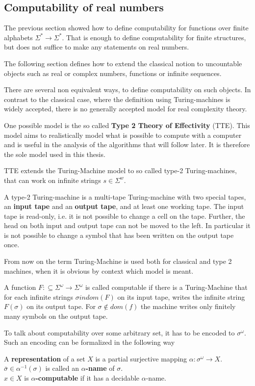 \subsection{Computability of real numbers}
The previous section showed how to define computability for functions over finite alphabets $\Sigma^* \to \Sigma^*$. 
That is enough to define computability for finite structures, but does not
suffice to make any statements on real numbers.

The following section defines how to extend the classical notion to uncountable
objects such as real or complex numbers, functions or infinite sequences.

There are several non equivalent ways, to define computability on such objects. 
In contrast to the classical case, where the definition using Turing-machines is widely accepted, there is no 
generally accepted model for real complexity theory.

One possible model is the so called \textbf{Type 2 Theory of Effectivity}
(TTE). \cite{Weihrauch} 
This model aims to realistically model what is possible to compute with a
computer and is useful in the analysis of the algorithms that will follow
later.
It is therefore the sole model used in this thesis. 

TTE extends the Turing-Machine model to so called type-2 Turing-machines, that
can work on infinite strings $s \in \Sigma^w$. 
\begin{definition}
A type-2 Turing-machine is a multi-tape Turing-machine with two special tapes,
an \textbf{input tape} and an \textbf{output tape}, and at least one working
tape. 
The input tape is read-only, i.e. it is not possible to change a cell on the
tape. Further, the head on both input and output tape can not be moved to the
left. In particular it is not possible to change a symbol that has been written
on the output tape once. 
\end{definition}
From now on the term Turing-Machine is used both for classical and type 2
machines, when it is obvious by context which model is meant.
\begin{definition}\label{def:computability_ttt}
A function $F:\subseteq \Sigma^\omega \to \Sigma^\omega$ is called computable if there is a Turing-Machine  
that for each infinite strings $\sigma in dom(F)$ on its input tape, writes the infinite string $F(\sigma)$ on its output tape. 
For $\sigma \not \in dom(f)$ the machine writes only finitely many symbols on the output tape.  
\end{definition}
To talk about computability over some arbitrary set, it has to be encoded to
$\sigma^\omega$. 
Such an encoding can be formalized in the following way
\begin{definition}\label{def:representation}
	A \textbf{representation} of a set $X$ is a partial surjective mapping $\alpha: \sigma^\omega \to X$. \\
	$\bar \sigma \in \alpha^{-1}(\sigma)$ is called an \textbf{$\alpha$-name} of $\sigma$. \\
	$x \in X$ is \textbf{$\alpha$-computable} if it has a decidable $\alpha$-name.
\end{definition}

